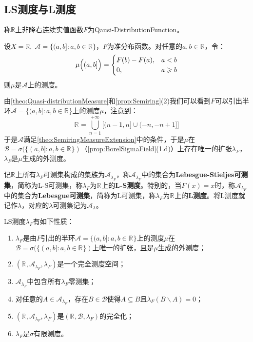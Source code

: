 \subsection{LS测度与L测度}
\begin{definition}
	称$\mathbb{R}$上非降右连续实值函数$F$为\gls{Qausi-DistributionFunction}。
\end{definition}
\begin{theorem}\label{theo:Quasi-distributionMeasure}
	设$X=\mathbb{R},\;\mathscr{A}=\{(a,b]:a,b\in\mathbb{R}\}$，$F$为准分布函数。对任意的$a,b\in\mathbb{R}$，令：
	\begin{equation*}
		\mu\Bigl((a,b]\Bigr)=
		\begin{cases}
			F(b)-F(a),&a<b \\
			0,&a\geqslant b
		\end{cases}
	\end{equation*}
	则$\mu$是$\mathscr{A}$上的测度。
\end{theorem}
\begin{note}
	由\cref{theo:Quasi-distributionMeasure}和\cref{prop:Semiring}(2)我们可以看到$F$可以引出半环$\mathscr{A}=\{(a,b]:a,b\in\mathbb{R}^{}\}$上的测度$\mu$，注意到：
	\begin{equation*}
		\mathbb{R}^{}=\underset{n=1}{\overset{+\infty}{\bigcup}}\Big[(n-1,n]\cup(-n,-n+1]\Big]
	\end{equation*}
	于是$\mathscr{A}$满足\cref{theo:SemiringMeasureExtension}中的条件，于是$\mu$在$\mathcal{B}=\sigma(\{(a,b]:a,b\in\mathbb{R}^{}\})$（\cref{prop:BorelSigmaField}(1.d)）上存在唯一的扩张$\lambda_F$，$\lambda_F$是$\mu$生成的外测度。
\end{note}
\begin{definition}
	记$\mathbb{R}^{}$上所有$\lambda_F$可测集构成的集族为$\mathscr{A}_{\lambda_F}$，称$\mathscr{A}_{\lambda_F}$中的集合为\textbf{Lebesgue-Stieljes可测集}，简称为L-S可测集，称$\lambda_F$为$\mathbb{R}^{}$上的\textbf{L-S测度}。特别的，当$F(x)=x$时，称$\mathscr{A}_{\lambda_F}$中的集合为\textbf{Lebesgue可测集}，简称为L可测集，称$\lambda_F$为$\mathbb{R}^{}$上的\textbf{L测度}。将L测度就记作$\lambda$，对应的$\lambda$可测集记为$\mathscr{A}_{\lambda}$。
\end{definition}
\begin{property}\label{prop:LSMeasure}
	LS测度$\lambda_F$有如下性质：
	\begin{enumerate}
		\item $\lambda_F$是由$F$引出的半环$\mathscr{A}=\{(a,b]:a,b\in\mathbb{R}^{}\}$上的测度$\mu$在$\mathcal{B}=\sigma(\{(a,b]:a,b\in\mathbb{R}^{}\})$上唯一的扩张，且是$\mu$生成的外测度；
		\item $(\mathbb{R}^{},\mathscr{A}_{\lambda_F},\lambda_F)$是一个完全测度空间；
		\item $\mathscr{A}_{\lambda_F}$中包含所有$\lambda_F$零测集；
		\item 对任意的$A\in\mathscr{A}_{\lambda_F}$，存在$B\in\mathcal{B}$使得$A\subseteq B$且$\lambda_F(B\backslash A)=0$；
		\item $(\mathbb{R}^{},\mathscr{A}_{\lambda_F},\lambda_F)$是$(\mathbb{R}^{},\mathcal{B},\lambda_F)$的完全化；
		\item  $\lambda_F$是$\sigma$有限测度。
	\end{enumerate}
\end{property}
